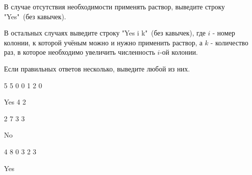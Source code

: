 В случае отсутствия необходимости применять раствор, выведите строку "Yes"\ (без кавычек).

В остальных случаях выведите строку "Yes i k"\ (без кавычек), где $i$ - номер колонии, к которой учёным можно и нужно применить раствор, а $k$ - количество раз, в которое необходимо увеличить численность $i$-ой колонии.

Если правильных ответов несколько, выведите любой из них.

\exampleSection


\begin{myverbbox}[\small]{\vinput}
5 5
0 0 1 2 0
\end{myverbbox}
\begin{myverbbox}[\small]{\voutput}
Yes 4 2
\end{myverbbox}


\begin{myverbbox}[\small]{\vinput}
2 7
3 3
\end{myverbbox}
\begin{myverbbox}[\small]{\voutput}
No
\end{myverbbox}


\begin{myverbbox}[\small]{\vinput}
4 8
0 3 2 3
\end{myverbbox}
\begin{myverbbox}[\small]{\voutput}
Yes
\end{myverbbox}


